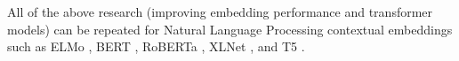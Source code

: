\documentclass[
	letterpaper, %
	10pt, %
]{journalArticle}
\begin{document}
All of the above research (improving embedding performance and transformer models) can be repeated for Natural Language Processing contextual embeddings such as ELMo \autocite{Peters:2018}, BERT \autocite{Devlin:2018}, RoBERTa \autocite{Liu:2019}, XLNet \autocite{Yang:2022}, and T5 \autocite{Raffel:2020}. 

\printbibliography %

\end{document}
